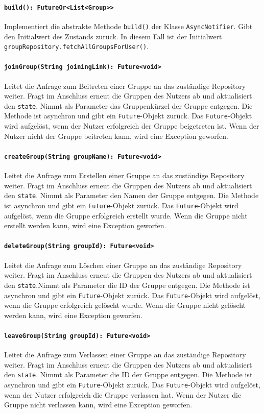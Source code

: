 \documentclass{entwurfsheft}
\begin{document}
\paragraph{\texttt{build(): FutureOr<List<Group>>}}
Implementiert die abstrakte Methode \texttt{build()} der Klasse \texttt{AsyncNotifier}. Gibt den Initialwert des Zustands zurück. In diesem Fall ist der Initialwert \texttt{groupRepository.fetchAllGroupsForUser()}.
\paragraph{\texttt{joinGroup(String joiningLink): Future<void>}}
Leitet die Anfrage zum Beitreten einer Gruppe an das zuständige Repository weiter. Fragt im Anschluss erneut die Gruppen des Nutzers ab und aktualisiert den \texttt{state}. Nimmt als Parameter das Gruppenkürzel der Gruppe entgegen. Die Methode ist asynchron und gibt ein \texttt{Future}-Objekt zurück. Das \texttt{Future}-Objekt wird aufgelöst, wenn der Nutzer erfolgreich der Gruppe beigetreten ist. Wenn der Nutzer nicht der Gruppe beitreten kann, wird eine Exception geworfen.
\paragraph{\texttt{createGroup(String groupName): Future<void>}}
Leitet die Anfrage zum Erstellen einer Gruppe an das zuständige Repository weiter. Fragt im Anschluss erneut die Gruppen des Nutzers ab und aktualisiert den \texttt{state}. Nimmt als Parameter den Namen der Gruppe entgegen. Die Methode ist asynchron und gibt ein \texttt{Future}-Objekt zurück. Das \texttt{Future}-Objekt wird aufgelöst, wenn die Gruppe erfolgreich erstellt wurde. Wenn die Gruppe nicht erstellt werden kann, wird eine Exception geworfen.
\paragraph{\texttt{deleteGroup(String groupId): Future<void>}}
Leitet die Anfrage zum Löschen einer Gruppe an das zuständige Repository weiter. Fragt im Anschluss erneut die Gruppen des Nutzers ab und aktualisiert den \texttt{state}.Nimmt als Parameter die ID der Gruppe entgegen. Die Methode ist asynchron und gibt ein \texttt{Future}-Objekt zurück. Das \texttt{Future}-Objekt wird aufgelöst, wenn die Gruppe erfolgreich gelöscht wurde. Wenn die Gruppe nicht gelöscht werden kann, wird eine Exception geworfen.
\paragraph{\texttt{leaveGroup(String groupId): Future<void>}}
Leitet die Anfrage zum Verlassen einer Gruppe an das zuständige Repository weiter. Fragt im Anschluss erneut die Gruppen des Nutzers ab und aktualisiert den \texttt{state}. Nimmt als Parameter die ID der Gruppe entgegen. Die Methode ist asynchron und gibt ein \texttt{Future}-Objekt zurück. Das \texttt{Future}-Objekt wird aufgelöst, wenn der Nutzer erfolgreich die Gruppe verlassen hat. Wenn der Nutzer die Gruppe nicht verlassen kann, wird eine Exception geworfen.
\end{document}
